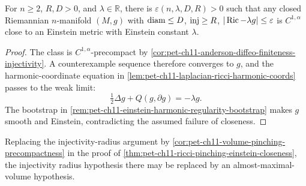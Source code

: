 \begin{theorem}
  \label{thm:pet-ch11-ricci-pinching-einstein-closeness}
  For $n\ge2$, $R,D>0$, and $\lambda\in\mathbb{R}$, there is
  $\varepsilon(n,\lambda,D,R)>0$ such that any closed Riemannian $n$-manifold
  $(M,g)$ with $\operatorname{diam}\le D$, $\operatorname{inj}\ge R$, $|\operatorname{Ric}-\lambda g|\le\varepsilon$ is
  $C^{1,\alpha}$ close to an Einstein metric with Einstein constant $\lambda$.
\end{theorem}
\begin{proof}
  \sketch
  The class is \(C^{1,\alpha}\)-precompact by \cref{cor:pet-ch11-anderson-diffeo-finiteness-injectivity}. A counterexample sequence therefore converges to \(g\), and the harmonic-coordinate equation in \cref{lem:pet-ch11-laplacian-ricci-harmonic-coords} passes to the weak limit:
  \[
    \tfrac12\Delta g+Q(g,\partial g)=-\lambda g.
  \]
  The bootstrap in \cref{rem:pet-ch11-einstein-harmonic-regularity-bootstrap} makes \(g\) smooth and Einstein, contradicting the assumed failure of closeness.
\end{proof}


\begin{remark}
  \label{rem:pet-ch11-ricci-pinching-volume-alternative}
  Replacing the injectivity-radius argument by
  \cref{cor:pet-ch11-volume-pinching-precompactness} in the
  proof of
  \cref{thm:pet-ch11-ricci-pinching-einstein-closeness}, the injectivity
  radius hypothesis there may be replaced by an almost-maximal-volume
  hypothesis.
\end{remark}

